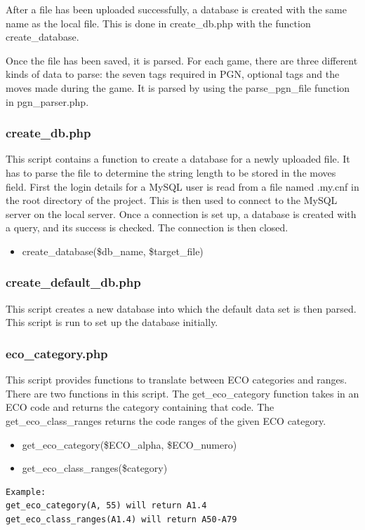 \documentclass{article}
\begin{document}
After a file has been uploaded successfully, a database is created with
the same name as the local file. This is done in create\_db.php with
the function create\_database.

Once the file has been saved, it is parsed. For each game, there are
three different kinds of data to parse: the seven tags required in PGN,
optional tags and the moves made during the game. It is parsed by
using the parse\_pgn\_file function in pgn\_parser.php.

\subsubsection{create\_db.php}
This script contains a function to create a database for a newly uploaded
file. It has to parse the file to determine the string length to be stored
in the moves field. First the login details for a MySQL user is read from
a file named .my.cnf in the root directory of the project.  This is then
used to connect to the MySQL server on the local server.  Once a connection
is set up, a database is created with a query, and its success is checked.
The connection is then closed.
\begin{itemize}
	\item create\_database(\$db\_name, \$target\_file)
\end{itemize}

\subsubsection{create\_default\_db.php}
This script creates a new database into which the default data set is then
parsed. This script is run to set up the database initially.

\subsubsection{eco\_category.php}
This script provides functions to translate between ECO categories and ranges.
There are two functions in this script. The get\_eco\_category function takes
in an ECO code and returns the category containing that code. The
get\_eco\_class\_ranges returns the code ranges of the given ECO category.
\begin{itemize}
	\item get\_eco\_category(\$ECO\_alpha, \$ECO\_numero)
	\item get\_eco\_class\_ranges(\$category)
\end{itemize}
\begin{lstlisting}
Example:
get_eco_category(A, 55) will return A1.4
get_eco_class_ranges(A1.4) will return A50-A79
\end{lstlisting}
\end{document}
